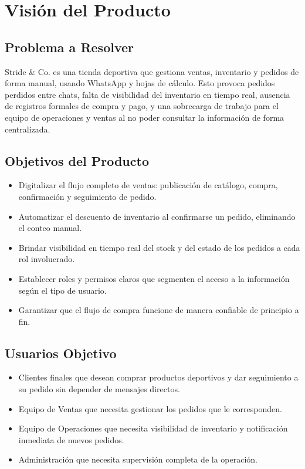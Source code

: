\documentclass[12pt, a4paper]{article}
\begin{document}
\section{Visión del Producto}

\subsection{Problema a Resolver}
Stride \& Co. es una tienda deportiva que gestiona ventas, inventario y pedidos de forma manual, usando WhatsApp y hojas de cálculo. Esto provoca pedidos perdidos entre chats, falta de visibilidad del inventario en tiempo real, ausencia de registros formales de compra y pago, y una sobrecarga de trabajo para el equipo de operaciones y ventas al no poder consultar la información de forma centralizada.

\subsection{Objetivos del Producto}
\begin{itemize}[leftmargin=*]
    \item Digitalizar el flujo completo de ventas: publicación de catálogo, compra, confirmación y seguimiento de pedido.
    \item Automatizar el descuento de inventario al confirmarse un pedido, eliminando el conteo manual.
    \item Brindar visibilidad en tiempo real del stock y del estado de los pedidos a cada rol involucrado.
    \item Establecer roles y permisos claros que segmenten el acceso a la información según el tipo de usuario.
    \item Garantizar que el flujo de compra funcione de manera confiable de principio a fin.
\end{itemize}

\subsection{Usuarios Objetivo}
\begin{itemize}[leftmargin=*]
    \item Clientes finales que desean comprar productos deportivos y dar seguimiento a su pedido sin depender de mensajes directos.
    \item Equipo de Ventas que necesita gestionar los pedidos que le corresponden.
    \item Equipo de Operaciones que necesita visibilidad de inventario y notificación inmediata de nuevos pedidos.
    \item Administración que necesita supervisión completa de la operación.
\end{itemize}
\end{document}
